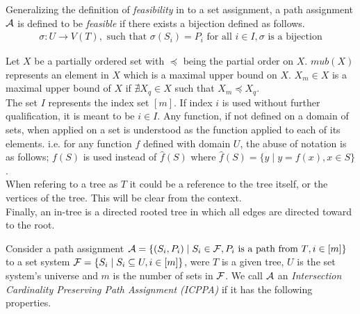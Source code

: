 \documentclass[MS]             %
              {iitmdiss_as}    %
\begin{document}
\noindent
Generalizing the definition of {\em feasibility} in \cite{nsnrs09} to
a set assignment, a path assignment ${\mathcal A}$ is defined to be {\em
  feasible} if there exists a bijection defined as follows.
\begin{align}
  \sigma: U \rightarrow V(T), \text{ such that }\sigma(S_i) = P_i
  \text{ for all } i \in I, \sigma \text{ is a bijection}
  \label{eq:stf}
\end{align}


\noindent
Let $X$ be a partially ordered set with $\preccurlyeq$ being the
partial order on $X$.  $mub(X)$ represents an element in $X$ which is
a maximal upper bound on $X$.  $X_m \in X$ is a maximal upper bound of
$X$ if $\nexists X_q \in X$ such that $X_m
\preccurlyeq X_q$. \\

\noindent
The set $I$ represents the index set $[m]$. If index $i$ is used
without further qualification, it is meant to be $i \in I$. Any
function, if not defined on a domain of sets, when applied on a set is
understood as the function applied to each of its elements. i.e. for
any function $f$ defined with domain $U$, the abuse of notation is as
follows; $f(S)$ is used instead of $\hat f(S)$ where
$\hat f(S) = \{y \mid y = f(x), x \in S\}$. \\

\noindent
When refering to a tree as $T$ it could be a reference to the tree
itself, or the vertices of the tree. This will be clear from the
context.\\

\noindent
Finally, an in-tree is a directed rooted tree in which all edges are
directed toward to the root.


\label{feasible} 
Consider a path assignment ${\cal A} =
\{(S_i, P_i) \mid S_i \in {\cal F}, P_i \text{ is a path from $T$}, i \in
[m]\}$ to a set system ${\cal F} = \{S_i \mid S_i \subseteq U, i \in
[m]\}$, were $T$ is a given tree, $U$ is the set system's universe and
$m$ is the number of sets in ${\cal F}$. We call ${\cal A}$ an {\em Intersection
  Cardinality Preserving Path Assignment (ICPPA)} if it has the
following properties.
\end{document}
